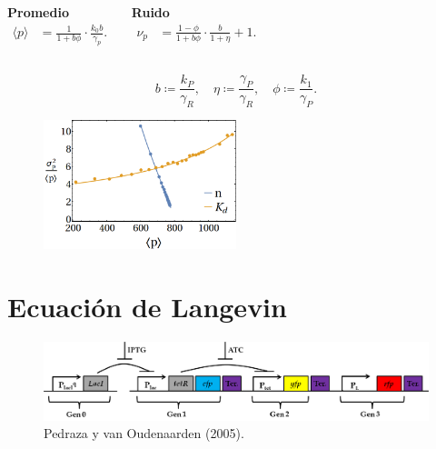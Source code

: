 \documentclass[xcolor=dvipsnames]{beamer}
\begin{document}
\begin{frame}
\begin{columns}[c]

\vspace{3mm}


\centering \textbf{Promedio}
\begin{align*}
\langle p \rangle &= \frac{1}{1+b\phi} \cdot \frac{k_0b}{\gamma_p}.
\end{align*}

\centering \textbf{Ruido}
\begin{align*}
\nu_p &= \frac{1-\phi}{1+b\phi} \cdot \frac{b}{1+\eta}+1.
\end{align*}
\end{columns}

\vspace{3 mm}

\begin{equation*}
  b \coloneqq \frac{k_P}{\gamma_R}, \quad \eta \coloneqq \frac{\gamma_P}{\gamma_R}, \quad \phi \coloneqq \frac{k_1}{\gamma_P}.
\end{equation*}

\begin{figure}[p]
    \centering
    \includegraphics[width=0.5\textwidth]{Pmas-autorreg_analytic_solver}
\end{figure}

\end{frame}

\section{Ecuaci\'on de Langevin}

\begin{frame}
\begin{figure}[p]
    \centering
    \includegraphics[width=\textwidth]{Pcon-circuit_simple}\\
    \tiny Pedraza y van Oudenaarden (2005).
\end{figure}
\end{frame}
\end{document}
